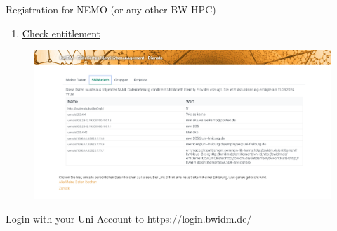 \documentclass{beamer}
\begin{document}
\begin{frame}{Registration for NEMO (or any other BW-HPC)}


\begin{enumerate}
    \item \href{https://wiki.bwhpc.de/e/Registration/bwUniCluster/Entitlement}{Check entitlement}

\end{enumerate}

\begin{figure}
    \centering
    \includegraphics[width=0.95\linewidth]{figures/BWIDM_entitlement.png}
\end{figure}
Login with your Uni-Account to https://login.bwidm.de/

\end{frame}
\end{document}
